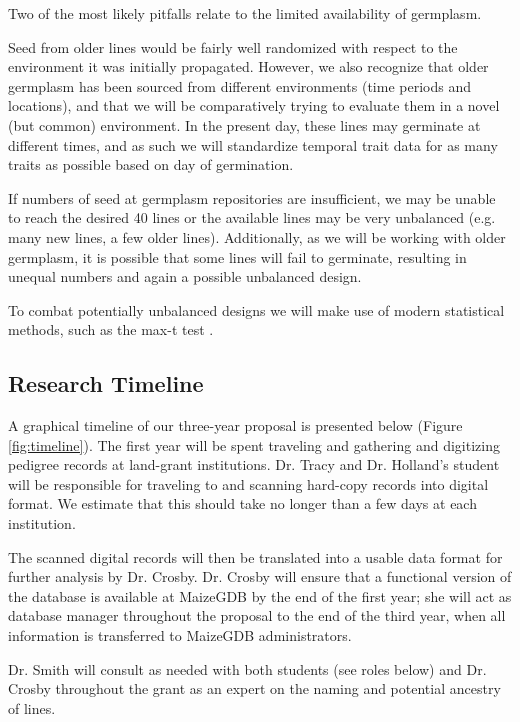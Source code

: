 \documentclass[12pt]{article}
\begin{document}
Two of the most likely pitfalls relate to the limited availability of germplasm. 

Seed from older lines would be fairly well randomized with respect to the environment it was initially propagated. 
However, we also recognize that older germplasm has been sourced from different environments (time periods and locations), and that we will be comparatively trying to evaluate them in a novel (but common) environment.
In the present day, these lines may germinate at different times, and as such we will standardize temporal trait data for as many traits as possible based on day of germination.

If numbers of seed at germplasm repositories are insufficient, we may be unable to reach the desired 40 lines or the available lines may be very unbalanced (e.g. many new lines, a few older lines).
Additionally, as we will be working with older germplasm, it is possible that some lines will fail to germinate, resulting in unequal numbers and again a possible unbalanced design. 

To combat potentially unbalanced designs we will make use of modern statistical methods, such as the max-t test \citep{herberich2010robust}. 

\subsection*{Research Timeline}
A graphical timeline of our three-year proposal is presented below (Figure \ref{fig:timeline}).
The first year will be spent traveling and gathering and digitizing pedigree records at land-grant institutions.
Dr. Tracy and Dr. Holland's  student will be responsible for traveling to and scanning hard-copy records into digital format.  
We estimate that this should take no longer than a few days at each institution.


The scanned digital records will then be translated into a usable data format for further analysis by Dr. Crosby.  Dr. Crosby will ensure that a functional version of the database is available at MaizeGDB by the end of the first year; she will act as database manager throughout the proposal to the end of the third year, when all information is transferred to MaizeGDB administrators. 

Dr. Smith will consult as needed with both students (see roles below) and Dr. Crosby throughout the grant as an expert on the naming and potential ancestry of lines.
\end{document}

